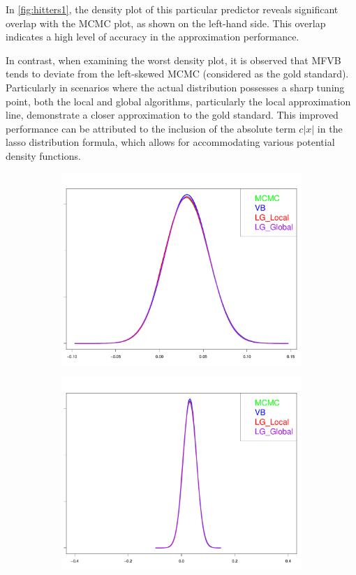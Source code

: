 In \autoref{fig:hitters1}, the density plot of this particular predictor reveals significant overlap with the MCMC plot, as shown on the left-hand side. This overlap indicates a high level of accuracy in the approximation performance.

In contrast, when examining the worst density plot, it is observed that MFVB tends to deviate from the left-skewed MCMC (considered as the gold standard). Particularly in scenarios where the actual distribution possesses a sharp tuning point, both the local and global algorithms, particularly the local approximation line, demonstrate a closer approximation to the gold standard. This improved performance can be attributed to the inclusion of the absolute term $c|x|$ in the lasso distribution formula, which allows for accommodating various potential density functions.
\newpage
\begin{figure}[h]
	\begin{subfigure}{0.5\textwidth}
		\centering
		\includegraphics[page = 1, width=\linewidth,keepaspectratio]{lasso_densities_Kakadu.pdf}
	\end{subfigure}
	\begin{subfigure}{0.5\textwidth}
		\includegraphics[page = 2, width=\linewidth,keepaspectratio]{lasso_densities_Kakadu-1.pdf}

\end{subfigure}
\end{figure}
